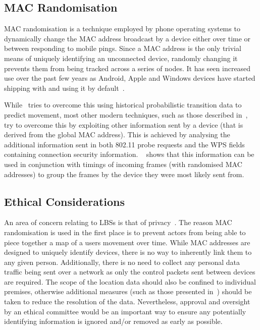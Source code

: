 \subsection{MAC Randomisation}\label{sec:mac-randomsiation}
MAC randomisation is a technique employed by phone operating systems to dynamically change the MAC address broadcast by a device either over time or between responding to mobile pings.
Since a MAC address is the only trivial means of uniquely identifying an unconnected device, randomly changing it prevents them from being tracked across a series of nodes.
It has seen increased use over the past few years as Android, Apple and Windows devices have started shipping with and using it by default~\cite{vanhoef2016mac,matte2018spread}.

While~\cite{hong2018crowdprobe} tries to overcome this using historical probabilistic transition data to predict movement, most other modern techniques, such as those described in~\cite{vanhoef2016mac,martin2017study}, try to overcome this by exploiting other information sent by a device (that is derived from the global MAC address).
This is achieved by analysing the additional information sent in both 802.11 probe requests and the WPS fields containing connection security information.
~\cite{matte2016defeating} shows that this information can be used in conjunction with timings of incoming frames (with randomised MAC addresses) to group the frames by the device they were most likely sent from. 

\subsection{Ethical Considerations}\label{sec:ethical-considerations}
An area of concern relating to LBSs is that of privacy~\cite{freudiger2015talkative,shen2020wi}.
The reason MAC randomisation is used in the first place is to prevent actors from being able to piece together a map of a users movement over time.
While MAC addresses are designed to uniquely identify devices, there is no way to inherently link them to any given person.
Additionally, there is no need to collect any personal data traffic being sent over a network as only the control packets sent between devices are required.
The scope of the location data should also be confined to individual premises, otherwise additional measures (such as those presented in~\cite{gruteser2003anonymous}) should be taken to reduce the resolution of the data.
Nevertheless, approval and oversight by an ethical committee would be an important way to ensure any potentially identifying information is ignored and/or removed as early as possible.
